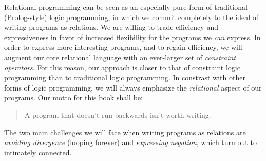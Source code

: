 %

%
Relational
%
%
programming can be seen as an especially pure form of
traditional (Prolog-style) logic programming, in which we commit
completely to the ideal of writing programs as relations.
%
We are willing to trade efficiency and expressiveness in favor of
increased flexibility for the programs we \emph{can} express.
%
In order to express more interesting programs, and to regain
efficiency, we will augment our core relational language with an
ever-larger set of \emph{constraint operators}.
%
For
%
%
this reason, our approach is closer to that of constraint logic
  programming than to traditional logic programming.
%
In constrast with other forms of logic programming, we will always
emphasize the \emph{relational} aspect of our programs.
%
Our motto for this book shall be:

\begin{quotation}
A program that doesn't run backwards isn't worth writing.
\end{quotation}


The
%
%
two main challenges we will face when writing programs as
relations are \emph{avoiding divergence} (looping forever) and
\emph{expressing negation}, which turn out to intimately connected.





%
%

